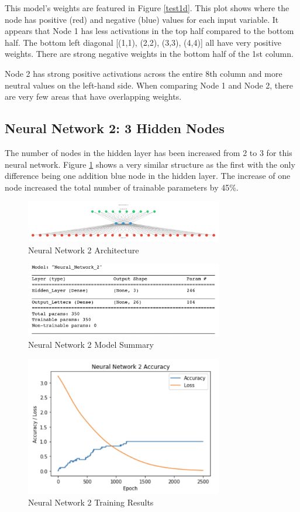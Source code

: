 \documentclass[5p,authoryear]{elsarticle}
\begin{document}
This model’s weights are featured in Figure \ref{test1d}. 
This plot shows where the node has positive (red) and negative (blue) values for each input variable. 
It appears that Node 1 has less activations in the top half compared to the bottom half. 
The bottom left diagonal [(1,1), (2,2), (3,3), (4,4)] all have very positive weights. 
There are strong negative weights in the bottom half of the 1st column. 

Node 2 has strong positive activations across the entire 8th column and more neutral values on the left-hand side. 
When comparing Node 1 and Node 2, there are very few areas that have overlapping weights. 


\subsection{Neural Network 2: 3 Hidden Nodes}\label{two}

The number of nodes in the hidden layer has been increased from 2 to 3 for this neural network. 
Figure \ref{test2a} shows a very similar structure as the first with the only difference being one addition blue node in the hidden layer. 
The increase of one node increased the total number of trainable parameters by 45\%.

\begin{figure}[!htb] \centering
	\includegraphics[width=3.4in]{figures/nn2.pdf}
	\caption[]{Neural Network 2 Architecture} 
	\label{test2a} 
\end{figure}


\begin{figure}[!htb] \centering
	\includegraphics[width=3.4in]{figures/nn2 sum.png}
	\caption[]{Neural Network 2 Model Summary} 
	\label{test2b} 
\end{figure}

\begin{figure}[!htb] \centering
	\includegraphics[width=3.4in]{figures/nn2 plot.png}
	\caption[]{Neural Network 2 Training Results} 
	\label{test2c}
\end{figure}
\end{document}
